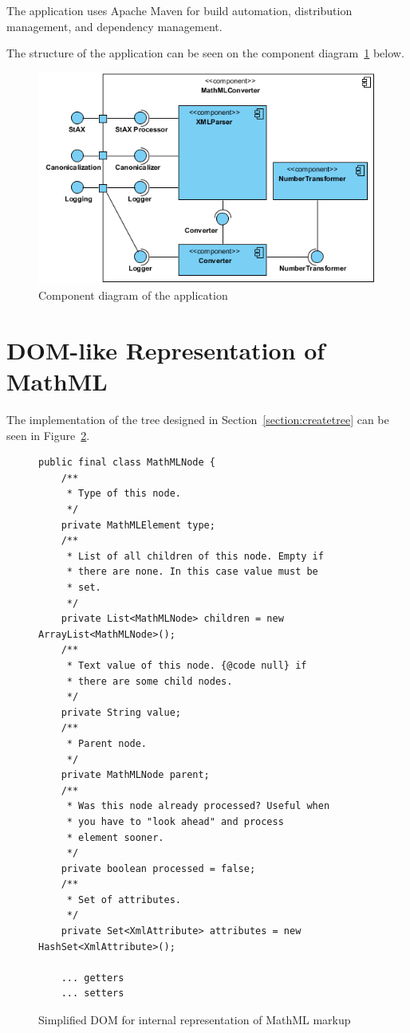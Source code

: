 \documentclass[11pt,oneside,final]{fithesis2}
\begin{document}
The application uses Apache Maven for build automation, distribution management, and dependency management.

The structure of the application can be seen on the component diagram~\ref{fig:componentdiagram} below.

\begin{figure}[!ht]
\centering
\includegraphics[width=\textwidth]{component_diagram}
\caption{Component diagram of the application}
\label{fig:componentdiagram}
\end{figure}

\section{DOM-like Representation of MathML}
The implementation of the tree designed in Section~\ref{section:createtree} can be seen in Figure~\ref{fig:customdom}.

\begin{figure}[!ht]
\begin{lstlisting}
public final class MathMLNode {
    /**
     * Type of this node.
     */
    private MathMLElement type;
    /**
     * List of all children of this node. Empty if 
     * there are none. In this case value must be 
     * set.
     */
    private List<MathMLNode> children = new ArrayList<MathMLNode>();
    /**
     * Text value of this node. {@code null} if 
     * there are some child nodes.
     */
    private String value;
    /**
     * Parent node.
     */
    private MathMLNode parent;
    /**
     * Was this node already processed? Useful when 
     * you have to "look ahead" and process
     * element sooner.
     */
    private boolean processed = false;
    /**
     * Set of attributes.
     */
    private Set<XmlAttribute> attributes = new HashSet<XmlAttribute>();
    
    ... getters
    ... setters
\end{lstlisting}
\caption{Simplified DOM for internal representation of MathML markup}
\label{fig:customdom}
\end{figure}
\end{document}
